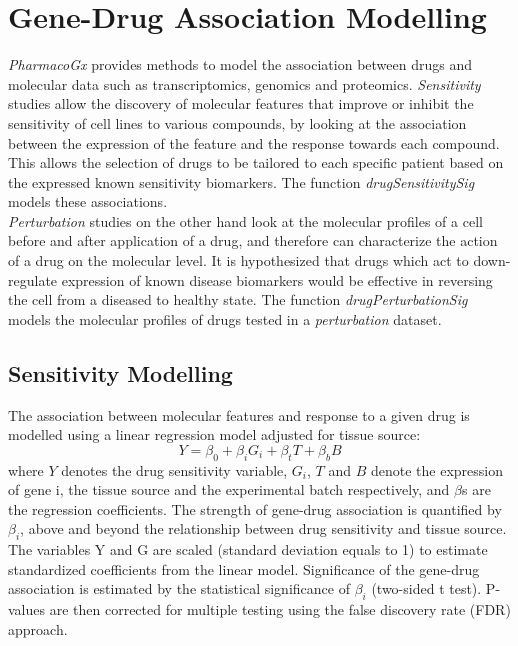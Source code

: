 \documentclass[11pt]{article}
\begin{document}
\section{Gene-Drug Association Modelling}
\textit{PharmacoGx} provides methods to model the association between drugs and molecular data such as transcriptomics, genomics and proteomics. 
\textit{Sensitivity} studies allow the discovery of molecular features that improve or inhibit the sensitivity of cell lines to various compounds, by looking at the association between the expression of the feature and the response towards each compound. This allows the selection of drugs to be tailored to each specific patient based on the expressed known sensitivity biomarkers. The function \textit{drugSensitivitySig} models these associations.\\

\textit{Perturbation} studies on the other hand look at the molecular profiles of a cell before and after application of a drug, and therefore can characterize the action of a drug on the molecular level. It is hypothesized that drugs which act to down-regulate expression of known disease biomarkers would be effective in reversing the cell from a diseased to healthy state. The function \textit{drugPerturbationSig} models the molecular profiles of drugs tested in a \textit{perturbation} dataset.

\subsection{Sensitivity Modelling}
The association between molecular features and response to a given drug is modelled using a linear regression model adjusted for tissue source: 
$$Y = \beta_{0} + \beta_{i}G_i + \beta_{t}T + \beta_{b}B$$
where $Y$ denotes the drug sensitivity variable, $G_i$, $T$ and $B$ denote the expression of gene i, the tissue source and the experimental batch respectively, and $\beta$s are the regression coefficients. The strength of gene-drug association is quantified by $\beta_i$, above and beyond the relationship between drug sensitivity and tissue source. The variables Y and G are scaled (standard deviation equals to 1) to estimate standardized coefficients from the linear model. Significance of the gene-drug association is estimated by the statistical significance of $\beta_i$ (two-sided t test). P-values are then corrected for multiple testing using the false discovery rate (FDR) approach.\\
\end{document}
